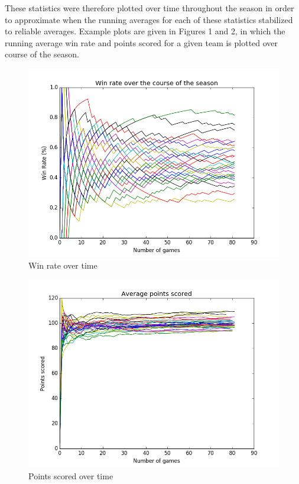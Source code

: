 \documentclass{article}
\begin{document}
These statistics were therefore plotted over time throughout the season in order to approximate when the running averages for each of these statistics stabilized to reliable averages. Example plots are given in Figures 1 and 2, in which the running average win rate and points scored for a given team is plotted over course of the season.

\begin{figure}[width=\linewidth]
\centering
  \includegraphics[width=1\linewidth]{code/figures/win_rate.png}
\caption{Win rate over time}
\end{figure}

\begin{figure}[width=\linewidth]
\centering
  \includegraphics[width=1\linewidth]{code/figures/points_scored.png}
\caption{Points scored over time}
\end{figure}
\end{document}
